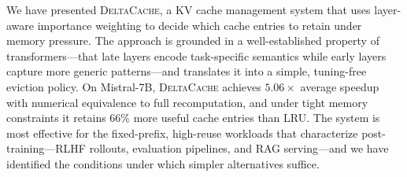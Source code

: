 \documentclass{article}
\newcommand{\deltacache}{\textsc{DeltaCache}}
\begin{document}
We have presented \deltacache{}, a KV cache management system that uses layer-aware importance weighting to decide which cache entries to retain under memory pressure. The approach is grounded in a well-established property of transformers---that late layers encode task-specific semantics while early layers capture more generic patterns---and translates it into a simple, tuning-free eviction policy. On Mistral-7B, \deltacache{} achieves $5.06\times$ average speedup with numerical equivalence to full recomputation, and under tight memory constraints it retains 66\% more useful cache entries than LRU. The system is most effective for the fixed-prefix, high-reuse workloads that characterize post-training---RLHF rollouts, evaluation pipelines, and RAG serving---and we have identified the conditions under which simpler alternatives suffice.



\end{document}
